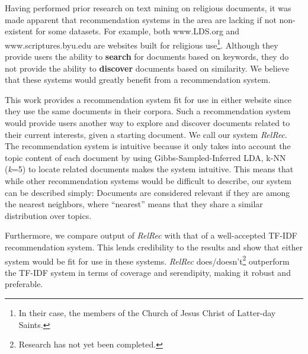 Having performed prior research on text mining on religious documents, it was made apparent that recommendation systems in the area are lacking if not non-existent for some datasets. For example, both www.LDS.org and www.scriptures.byu.edu are websites built for religious use\footnote{In their case, the members of the Church of Jesus Christ of Latter-day Saints.}. Although they provide users the ability to \textbf{search} for documents based on keywords, they do not provide the ability to \textbf{discover} documents based on similarity. We believe that these systems would greatly benefit from a recommendation system.

This work provides a recommendation system fit for use in either website since they use the same documents in their corpora. Such a recommendation system would provide users another way to explore and discover documents related to their current interests, given a starting document. We call our system \textit{RelRec}. The recommendation system is intuitive because it only takes into account the topic content of each document by using Gibbs-Sampled-Inferred LDA, k-NN (\textit{k}=5) to locate related documents makes the system intuitive. This means that while other recommendation systems would be difficult to describe, our system can be described simply: Documents are considered relevant if they are among the nearest neighbors, where ``nearest'' means that they share a similar distribution over topics. %

Furthermore, we compare output of \textit{RelRec} with that of a well-accepted TF-IDF recommendation system. This lends credibility to the results and show that either system would be fit for use in these systems. \textit{RelRec} does/doesn't\footnote{Research has not yet been completed.} outperform the TF-IDF system in terms of coverage and serendipity, making it robust and preferable.
